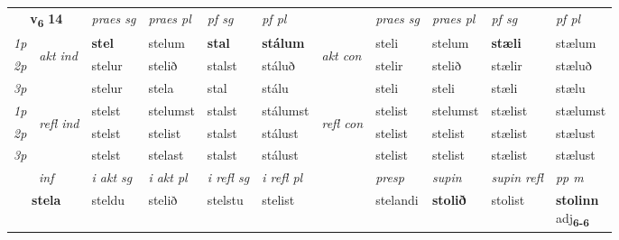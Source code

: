 \noindent
\begin{tabular}{lllllllllll} \toprule
\multicolumn{2}{c}{\textbf{v{\textsubscript{6}}} \Large{\textbf{14}}}  &  \textit{praes sg}  & \textit{praes pl}  &\textit{ pf sg} & \textit{pf pl} &  &  \textit{praes sg}  & \textit{praes pl}  & \textit{pf sg} & \textit{pf pl } \\*
	\cmidrule{3-6} \cmidrule{8-11}
 {\textit{1p}} & \multirow{3}{*}{\begin{turn}{90}\textit{akt ind}\end{turn}} & \textbf{stel} & stelum & \textbf{stal} & \textbf{stálum} & \multirow{3}{*}{\begin{turn}{90}\textit{akt con}\end{turn}} &steli & stelum & \textbf{stæli} & stælum\\*
 {\textit{2p}} &  &  stelur  & stelið & stalst & stáluð & & stelir & stelið & stælir & stæluð \\*
{\textit{3p}} &  & stelur & stela & stal & stálu & & steli & steli& stæli & stælu \\*
\cmidrule{3-6} \cmidrule{8-11}
 {\textit{1p}} & \multirow{3}{*}{\begin{turn}{90}\textit{refl ind}\end{turn}}  & stelst & stelumst & stalst & stálumst & \multirow{3}{*}{\begin{turn}{90}\textit{refl con}\end{turn}}  &stelist & stelumst & stælist & stælumst \\*
 {\textit{2p}} &  & stelst & stelist & stalst & stálust & &stelist & stelist & stælist & stælust \\*
 {\textit{3p}}  & & stelst & stelast & stalst & stálust & & stelist & stelist& stælist & stælust \\*
\cmidrule{3-6} \cmidrule{8-11}

   \multicolumn{2}{c}{\textit{inf}}  & \textit{i akt sg} & \textit{i akt pl} & \textit{i refl sg} & \textit{i refl pl} && \textit{presp} & \textit{supin} & \textit{supin refl} & \textit{pp m} \\*
  \multicolumn{2}{c}{\textbf{stela}} & steldu  & stelið & stelstu & stelist && stelandi &  \textbf{stolið} & stolist & \specialcell{\textbf{stolinn} \\ adj\textbf{\textsubscript{6-6}}} \\*
\end{tabular}


